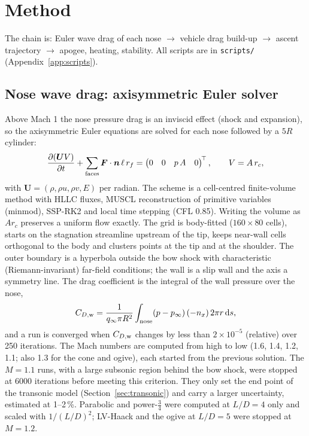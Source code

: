 \section{Method}
\label{sec:method}

The chain is: Euler wave drag of each nose $\rightarrow$ vehicle drag build-up $\rightarrow$ ascent
trajectory $\rightarrow$ apogee, heating, stability. All scripts are in \texttt{scripts/} (Appendix~\ref{app:scripts}).

\subsection{Nose wave drag: axisymmetric Euler solver}
\label{sec:euler}

Above Mach 1 the nose pressure drag is an inviscid effect (shock and expansion), so the
axisymmetric Euler equations are solved for each nose followed by a $5R$ cylinder:
\begin{equation}
\frac{\partial (\boldsymbol U V)}{\partial t} + \sum_{\rm faces} \boldsymbol F\cdot\boldsymbol n\, \ell\, r_f
= \begin{pmatrix} 0 & 0 & p\,A & 0 \end{pmatrix}^{\!\top},
\qquad V = A\, r_c ,
\end{equation}
with $\boldsymbol U = (\rho,\rho u,\rho v,E)$ per radian. The scheme is a cell-centred
finite-volume method with HLLC fluxes, MUSCL reconstruction of primitive variables (minmod),
SSP-RK2 and local time stepping (CFL 0.85). Writing the volume as $A r_c$ preserves a uniform
flow exactly. The grid is body-fitted ($160\times80$ cells), starts on the stagnation streamline
upstream of the tip, keeps near-wall cells orthogonal to the body and clusters points at the tip
and at the shoulder. The outer boundary is a hyperbola outside the bow shock with
characteristic (Riemann-invariant) far-field conditions; the wall is a slip wall and the axis a
symmetry line. The drag coefficient is the integral of the wall pressure over the nose,
\begin{equation}
C_{D,\rm w} = \frac{1}{q_\infty \pi R^2}\int_{\rm nose} (p-p_\infty)\,(-n_x)\, 2\pi r\,\mathrm ds ,
\end{equation}
and a run is converged when $C_{D,\rm w}$ changes by less than $2\times10^{-5}$ (relative) over
250 iterations. The Mach numbers are computed from high to low (1.6, 1.4, 1.2, 1.1; also 1.3 for
the cone and ogive), each started from the previous solution. The $M=1.1$ runs, with a large
subsonic region behind the bow shock, were stopped at 6000 iterations before meeting this
criterion. They only set the end point of the transonic model (Section~\ref{sec:transonic}) and
carry a larger uncertainty, estimated at 1--2\,\%. Parabolic and power-$\tfrac34$ were computed at
$L/D=4$ only and scaled with $1/(L/D)^2$; LV-Haack and the ogive at $L/D=5$ were stopped at $M=1.2$.

